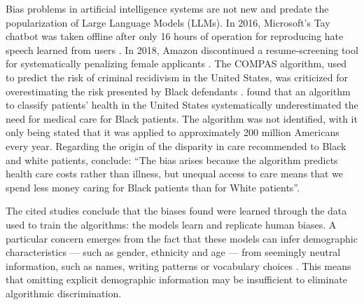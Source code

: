 \documentclass[jair,11pt,letterpaper]{article}
\begin{document}
Bias problems in artificial intelligence systems are not new and predate the popularization of Large Language Models (LLMs). In 2016, Microsoft's Tay chatbot was taken offline after only 16 hours of operation for reproducing hate speech learned from users \cite{wolf2017}.
In 2018, Amazon discontinued a resume-screening tool for systematically penalizing female applicants \cite{dastin2018}. The
COMPAS algorithm, used to predict the risk of criminal recidivism in the United States, was criticized for overestimating the risk presented by Black defendants \cite{angwin2016}.  found that an algorithm to classify patients' health in the United States systematically underestimated the need for medical care for Black patients. The algorithm was not identified, with it only being stated that it was applied to approximately 200 million Americans every year. Regarding the origin of the disparity in care recommended to Black and white patients,  conclude:
``The bias arises because the algorithm predicts health care costs rather than illness, but unequal access to care means that we spend less money caring for Black patients than for White patients''.

The cited studies conclude that the biases found were learned through the data used to train the algorithms: the models learn and replicate human biases. A particular concern emerges from the fact that these models can infer demographic characteristics
--- such as gender, ethnicity and age --- from seemingly neutral information, such as names, writing patterns or vocabulary choices \cite{bai2024}. This means that omitting explicit demographic information may be insufficient to eliminate algorithmic discrimination.
\end{document}

